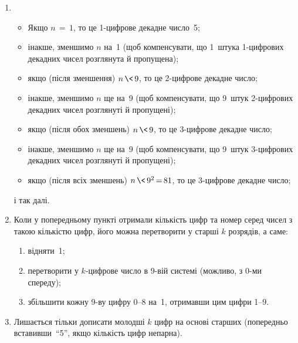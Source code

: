 \begin{enumerate}
\item
\begin{itemize}
\item
Якщо ${n\,{=}\,1}$, то це 1-цифрове декадне число~5;
\item
інакше, зменшимо $n$ на~1 (щоб компенсувати, що 1~штука 1-цифрових декадних чисел розглянута й пропущена);
\item
якщо (після зменшення) ${n\,{\<}\,9}$, то це 2-цифрове декадне число;
\item
інакше, зменшимо $n$ ще на~9 (щоб компенсувати, що 9~штук 2-цифрових декадних чисел розглянуті й пропущені);
\item
якщо (після обох зменшень) ${n\,{\<}\,9}$, то це 3-цифрове декадне число;
\item
інакше, зменшимо $n$ ще на~9 (щоб компенсувати, що 9~штук 3-цифрових декадних чисел розглянуті й пропущені);
\item
якщо (після всіх зменшень) ${n\,{\<}\,9^2\,{=}\,81}$, то це 3-цифрове декадне число;
\end{itemize}
і так далі.
\item
Коли у попередньому пункті отримали кількість цифр та номер серед чисел з такою кількістю цифр, його можна перетворити у старші $k$ розрядів, а саме:
\begin{enumerate}
\item	
відняти~1;
\item	
перетворити у $k$-цифрове число в 9-вій системі (можливо, з 0-ми спереду);
\item	
збільшити кожну 9-ву цифру 0--8 на~1, отримавши цим цифри 1--9.
\end{enumerate}
\item
Лишається тільки дописати молодші $k$ цифр на основі старших (попередньо вставивши~``5'', якщо кількість цифр непарна).
\end{enumerate}

